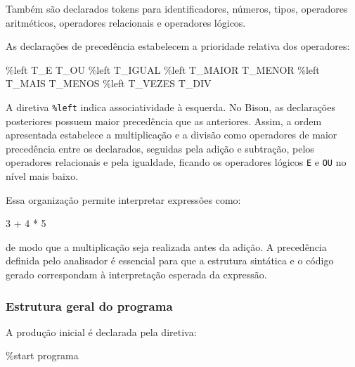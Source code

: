\documentclass[
  brazilian,
  letterpaper,
]{book}
\newenvironment{Shaded}{\begin{snugshade}}{\end{snugshade}}
\newcommand{\DecValTok}[1]{\textcolor[rgb]{0.68,0.00,0.00}{#1}}
\newcommand{\NormalTok}[1]{\textcolor[rgb]{0.00,0.23,0.31}{#1}}
\newcommand{\OperatorTok}[1]{\textcolor[rgb]{0.37,0.37,0.37}{#1}}
\theoremstyle{plain}
\theoremstyle{definition}
\theoremstyle{remark}
\begin{document}
Também são declarados tokens para identificadores, números, tipos,
operadores aritméticos, operadores relacionais e operadores lógicos.

As declarações de precedência estabelecem a prioridade relativa dos
operadores:

\begin{Shaded}
\begin{Highlighting}[]
\OperatorTok{\%}\NormalTok{left T\_E T\_OU}
\OperatorTok{\%}\NormalTok{left T\_IGUAL}
\OperatorTok{\%}\NormalTok{left T\_MAIOR T\_MENOR}
\OperatorTok{\%}\NormalTok{left T\_MAIS T\_MENOS}
\OperatorTok{\%}\NormalTok{left T\_VEZES T\_DIV}
\end{Highlighting}
\end{Shaded}

A diretiva \texttt{\%left} indica associatividade à esquerda. No Bison,
as declarações posteriores possuem maior precedência que as anteriores.
Assim, a ordem apresentada estabelece a multiplicação e a divisão como
operadores de maior precedência entre os declarados, seguidas pela
adição e subtração, pelos operadores relacionais e pela igualdade,
ficando os operadores lógicos \texttt{E} e \texttt{OU} no nível mais
baixo.

Essa organização permite interpretar expressões como:

\begin{Shaded}
\begin{Highlighting}[]
\DecValTok{3}\NormalTok{ + }\DecValTok{4}\NormalTok{ * }\DecValTok{5}
\end{Highlighting}
\end{Shaded}

de modo que a multiplicação seja realizada antes da adição. A
precedência definida pelo analisador é essencial para que a estrutura
sintática e o código gerado correspondam à interpretação esperada da
expressão.

\subsubsection{Estrutura geral do
programa}\label{estrutura-geral-do-programa}

A produção inicial é declarada pela diretiva:

\begin{Shaded}
\begin{Highlighting}[]
\OperatorTok{\%}\NormalTok{start programa}
\end{Highlighting}
\end{Shaded}
\end{document}
